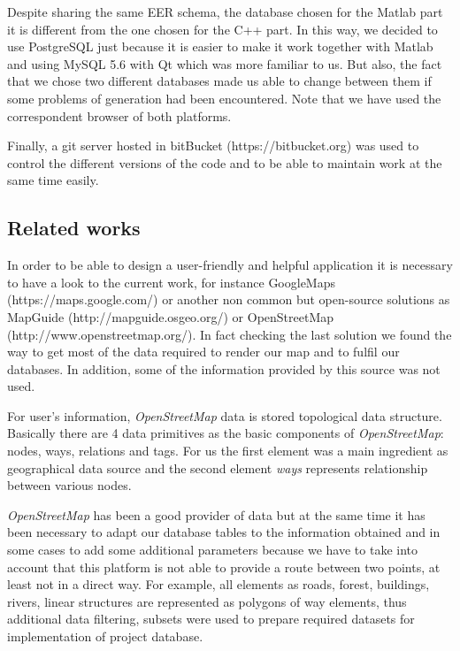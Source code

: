 \documentclass{article}
\begin{document}
Despite sharing the same EER schema, the database chosen for the Matlab part it is different from the one chosen for the C++ part. In this way, we decided to use PostgreSQL just because it is easier to make it work together with Matlab and using MySQL 5.6 with Qt which was more familiar to us. But also, the fact that we chose two different databases made us able to change between them if some problems of generation had been encountered. Note that we have used the correspondent browser of both platforms.

Finally, a git server hosted in bitBucket (https://bitbucket.org) was used to control the different versions of the code and to be able to maintain work at the same time easily.

\subsection{Related works}

In order to be able to design a user-friendly and helpful application it is necessary to have a look to the current work, for instance GoogleMaps (https://maps.google.com/) or another non common but open-source solutions as MapGuide (http://mapguide.osgeo.org/) or OpenStreetMap (http://www.openstreetmap.org/). In fact checking the last solution we found the way to get most of the data required to render our map and to fulfil our databases. In addition, some of the information provided by this source was not used.

For user's information, \textit{OpenStreetMap} data is stored topological data structure. Basically there are 4 data primitives as the basic components of \textit{OpenStreetMap}: nodes, ways, relations and tags. For us the first element was a main ingredient as geographical data source and the second element \textit{ways} represents relationship between various nodes. 

\textit{OpenStreetMap} has been a good provider of data but at the same time it has been necessary to adapt our database tables to the information obtained and in some cases to add some additional parameters because we have to take into account that this platform is not able to provide a route between two points, at least not in a direct way. For example, all elements as roads, forest, buildings, rivers, linear structures are represented as polygons of way elements, thus additional data filtering, subsets were used to prepare required datasets for implementation of project database.
\end{document}

